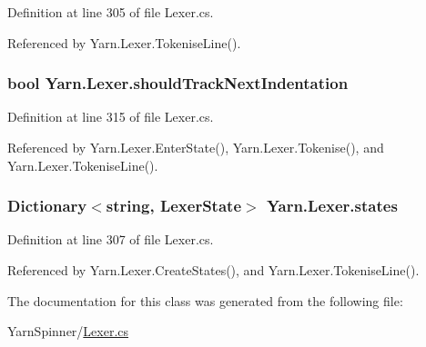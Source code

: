Definition at line 305 of file Lexer.\-cs.



Referenced by Yarn.\-Lexer.\-Tokenise\-Line().

\hypertarget{a00129_ac670aac2245cbd4694dfbd5b69313218}{
\subsubsection[{should\-Track\-Next\-Indentation}]{\setlength{\rightskip}{0pt plus 5cm}bool Yarn.\-Lexer.\-should\-Track\-Next\-Indentation\hspace{0.3cm}{\ttfamily [private]}}}\label{a00129_ac670aac2245cbd4694dfbd5b69313218}


Definition at line 315 of file Lexer.\-cs.



Referenced by Yarn.\-Lexer.\-Enter\-State(), Yarn.\-Lexer.\-Tokenise(), and Yarn.\-Lexer.\-Tokenise\-Line().

\hypertarget{a00129_a2c65c0ba90f973e459583badefef216a}{
\subsubsection[{states}]{\setlength{\rightskip}{0pt plus 5cm}Dictionary$<$string, {\bf Lexer\-State}$>$ Yarn.\-Lexer.\-states\hspace{0.3cm}{\ttfamily [private]}}}\label{a00129_a2c65c0ba90f973e459583badefef216a}


Definition at line 307 of file Lexer.\-cs.



Referenced by Yarn.\-Lexer.\-Create\-States(), and Yarn.\-Lexer.\-Tokenise\-Line().



The documentation for this class was generated from the following file\-:\begin{DoxyCompactItemize}
\item 
Yarn\-Spinner/\hyperlink{a00313}{Lexer.\-cs}\end{DoxyCompactItemize}
